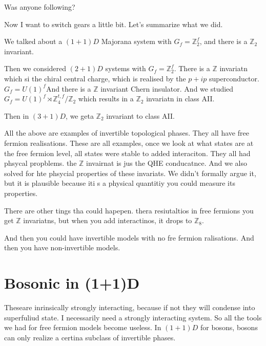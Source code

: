 Was anyone following?

Now I want to switch gears a little bit.
Let's summarize what we did.

We talked about a $(1+1)D$ Majorana system with
$G_f = \mathbb{Z}_2^f$,
and there is a $\mathbb{Z}_2$ invariant.

Then we considered $(2+1)D$ systems with $G_f=\mathbb{Z}_2^f$.
There is a $\mathbb{Z}$ invariatn which si the chiral central charge,
which is realised by the $p+ip$ superconductor.
$G_f = U(1)^f$And there is a $\mathbb{Z}$ invariant Chern insulator.
And we studied 
$G_f = U(1)^f \rtimes \mathbb{Z}_4^{t,f}/\mathbb{Z}_2$
which results in a $\mathbb{Z}_2$ invariatn in class AII.

Then in $(3+1)D$,
we geta $\mathbb{Z}_2$ invariant to class AII.

All the above are examples of invertible topological phases.
They all have free fermion realisations.
These are all examples,
once we look at what states are at the free fermion level,
all states were stable to added interaciton.
They all had phsycal propblems.
the $\mathbb{Z}$ invairnat is jus the QHE conducatnce.
And we also solved for hte phsycial properties of these invariats.
We didn't formally argue it,
but it is plausible because iti s a physical quantitiy you could measure its
properties.

There are other tings tha could hapepen.
thera resiutaltios in free fermions you get $\mathbb{Z}$ invariatns,
but when you add interactinos,
it drops to $\mathbb{Z}_8$.

And then you could have invertible models with no fre fermion ralisations.
And then you have non-invertible models.

\section{Bosonic in (1+1)D}
Theseare inrinsically strongly interacting,
because if not they will condense into superfuliud state.
I necessarily need a strongly interacting system.
So all the tools we had for free fermion models become useless.
In $(1+1)D$ for bosons,
bosons can only realize a certina subclass of invertible phases.

